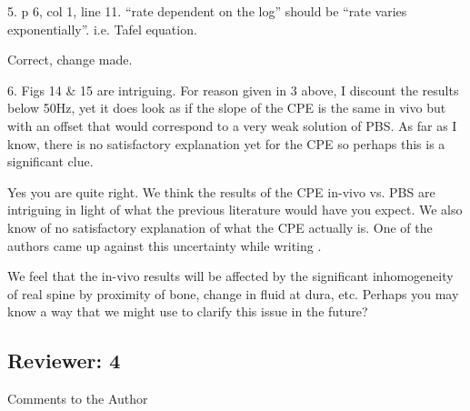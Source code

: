\documentclass[journal, a4paper]{IEEEtran}
\begin{document}
{    5. p 6, col 1, line 11. ``rate dependent on the log'' should be ``rate varies exponentially''. i.e. Tafel equation.

    {
        \color{blue}
        Correct, change made.
    }

    6. Figs 14 \& 15 are intriguing. For reason given in 3 above, I discount the results below 50Hz, yet it does look as if the slope of the CPE is the same in vivo but with an offset that would correspond to a very weak solution of PBS. As far as I know, there is no satisfactory explanation yet for the CPE so perhaps this is a significant clue.

    {
        \color{blue}
        Yes you are quite right. We think the results of the CPE in-vivo vs. PBS are intriguing in light of what the previous literature would have you expect. We also know of no satisfactory explanation of what the CPE actually is. One of the authors came up against this uncertainty while writing \cite{ScottSingle2013}.

        We feel that the in-vivo results will be affected by the significant inhomogeneity of real spine by proximity of bone, change in fluid at dura, etc. Perhaps you may know a way that we might use to clarify this issue in the future?
    }

}

\subsection*{Reviewer: 4}

Comments to the Author
\end{document}
